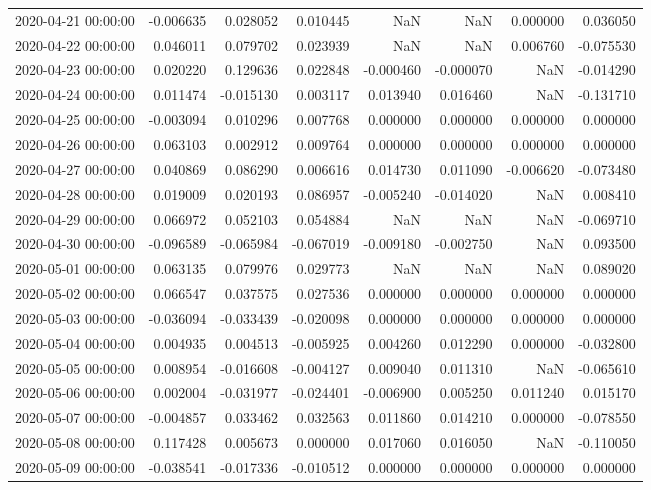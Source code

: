 \begin{tabular}{lrrrrrrr}
2020-04-21 00:00:00 & -0.006635 & 0.028052 & 0.010445 & NaN & NaN & 0.000000 & 0.036050 \\
2020-04-22 00:00:00 & 0.046011 & 0.079702 & 0.023939 & NaN & NaN & 0.006760 & -0.075530 \\
2020-04-23 00:00:00 & 0.020220 & 0.129636 & 0.022848 & -0.000460 & -0.000070 & NaN & -0.014290 \\
2020-04-24 00:00:00 & 0.011474 & -0.015130 & 0.003117 & 0.013940 & 0.016460 & NaN & -0.131710 \\
2020-04-25 00:00:00 & -0.003094 & 0.010296 & 0.007768 & 0.000000 & 0.000000 & 0.000000 & 0.000000 \\
2020-04-26 00:00:00 & 0.063103 & 0.002912 & 0.009764 & 0.000000 & 0.000000 & 0.000000 & 0.000000 \\
2020-04-27 00:00:00 & 0.040869 & 0.086290 & 0.006616 & 0.014730 & 0.011090 & -0.006620 & -0.073480 \\
2020-04-28 00:00:00 & 0.019009 & 0.020193 & 0.086957 & -0.005240 & -0.014020 & NaN & 0.008410 \\
2020-04-29 00:00:00 & 0.066972 & 0.052103 & 0.054884 & NaN & NaN & NaN & -0.069710 \\
2020-04-30 00:00:00 & -0.096589 & -0.065984 & -0.067019 & -0.009180 & -0.002750 & NaN & 0.093500 \\
2020-05-01 00:00:00 & 0.063135 & 0.079976 & 0.029773 & NaN & NaN & NaN & 0.089020 \\
2020-05-02 00:00:00 & 0.066547 & 0.037575 & 0.027536 & 0.000000 & 0.000000 & 0.000000 & 0.000000 \\
2020-05-03 00:00:00 & -0.036094 & -0.033439 & -0.020098 & 0.000000 & 0.000000 & 0.000000 & 0.000000 \\
2020-05-04 00:00:00 & 0.004935 & 0.004513 & -0.005925 & 0.004260 & 0.012290 & 0.000000 & -0.032800 \\
2020-05-05 00:00:00 & 0.008954 & -0.016608 & -0.004127 & 0.009040 & 0.011310 & NaN & -0.065610 \\
2020-05-06 00:00:00 & 0.002004 & -0.031977 & -0.024401 & -0.006900 & 0.005250 & 0.011240 & 0.015170 \\
2020-05-07 00:00:00 & -0.004857 & 0.033462 & 0.032563 & 0.011860 & 0.014210 & 0.000000 & -0.078550 \\
2020-05-08 00:00:00 & 0.117428 & 0.005673 & 0.000000 & 0.017060 & 0.016050 & NaN & -0.110050 \\
2020-05-09 00:00:00 & -0.038541 & -0.017336 & -0.010512 & 0.000000 & 0.000000 & 0.000000 & 0.000000 \\

\end{tabular}
